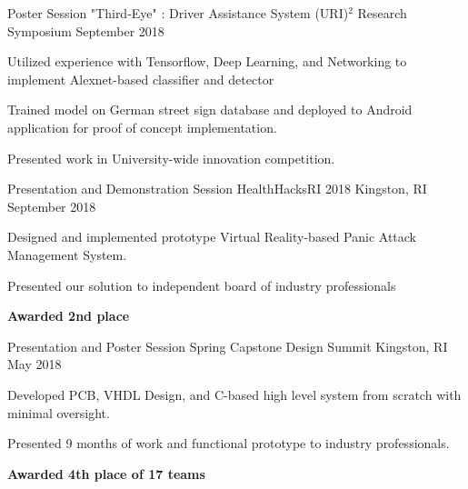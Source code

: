 \graduateheader
\begin{cventries}
    \cventry
    {Poster Session}
    {"Third-Eye" : Driver Assistance System}
    {(URI)$^2$ Research Symposium}
    {September 2018}
    {
      \begin{cvitems}
        \item{Utilized experience with Tensorflow, Deep Learning, and Networking to implement Alexnet-based classifier and detector}
        \item{Trained model on German street sign database and deployed to Android application for proof of concept implementation.}
        \item{Presented work in University-wide innovation competition.}
      \end{cvitems}
    }
  \cventry
    {Presentation and Demonstration Session}
    {HealthHacksRI 2018}
    {Kingston, RI}
    {September 2018}
    {
      \begin{cvitems}
        \item {Designed and implemented prototype Virtual Reality-based Panic Attack Management System.}
        \item{Presented our solution to independent board of industry professionals}
        \item{\textbf{Awarded 2nd place}}
      \end{cvitems}
    }
\end{cventries}
\vspace{-10 pt}
\ugradheader
\begin{cventries}
  \cventry
    {Presentation and Poster Session}
    {Spring Capstone Design Summit}
    {Kingston, RI}
    {May 2018}
    {
    \begin{cvitems}
      \item{Developed PCB, VHDL Design, and C-based high level system from scratch with minimal oversight.}
      \item{Presented 9 months of work and functional prototype to industry professionals.}
      \item{\textbf{Awarded 4th place of 17 teams}}
    \end{cvitems}
    }
\end{cventries}
\vspace{-10 pt}